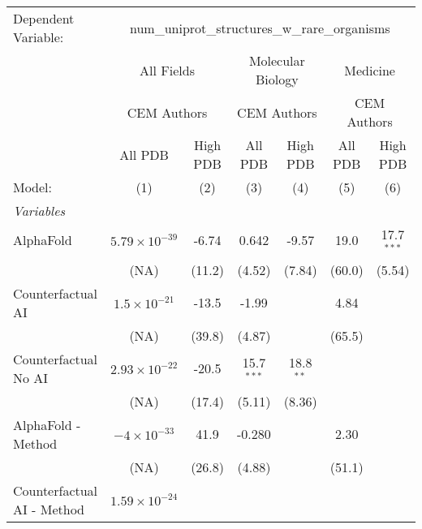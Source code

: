 \begingroup
\centering
\begin{tabular}{lcccccc}
   \tabularnewline \midrule \midrule
   Dependent Variable: & \multicolumn{6}{c}{num\_uniprot\_structures\_w\_rare\_organisms}\\
 & \multicolumn{2}{c}{All Fields} & \multicolumn{2}{c}{Molecular Biology} & \multicolumn{2}{c}{Medicine} \\
\cmidrule(lr){2-3} \cmidrule(lr){4-5} \cmidrule(lr){6-7}
 & \multicolumn{2}{c}{CEM Authors} & \multicolumn{2}{c}{CEM Authors} & \multicolumn{2}{c}{CEM Authors} \\
\cmidrule(lr){2-3} \cmidrule(lr){4-5} \cmidrule(lr){6-7}
 & \multicolumn{1}{c}{All PDB} & \multicolumn{1}{c}{High PDB} & \multicolumn{1}{c}{All PDB} & \multicolumn{1}{c}{High PDB} & \multicolumn{1}{c}{All PDB} & \multicolumn{1}{c}{High PDB} \\
\cmidrule(lr){2-2} \cmidrule(lr){3-3} \cmidrule(lr){4-4} \cmidrule(lr){5-5} \cmidrule(lr){6-6} \cmidrule(lr){7-7}
   Model:                                   & (1)                     & (2)    & (3)          & (4)         & (5)    & (6)\\  
   \midrule
   \emph{Variables}\\
   AlphaFold                                & $5.79\times 10^{-39}$   & -6.74  & 0.642        & -9.57       & 19.0   & 17.7$^{***}$\\   
                                            & (NA)                    & (11.2) & (4.52)       & (7.84)      & (60.0) & (5.54)\\   
   Counterfactual AI                        & $1.5\times 10^{-21}$    & -13.5  & -1.99        &             & 4.84   &   \\   
                                            & (NA)                    & (39.8) & (4.87)       &             & (65.5) &   \\   
   Counterfactual No AI                     & $2.93\times 10^{-22}$   & -20.5  & 15.7$^{***}$ & 18.8$^{**}$ &        &   \\   
                                            & (NA)                    & (17.4) & (5.11)       & (8.36)      &        &   \\   
   AlphaFold - Method                       & $-4\times 10^{-33}$     & 41.9   & -0.280       &             & 2.30   &   \\   
                                            & (NA)                    & (26.8) & (4.88)       &             & (51.1) &   \\   
   Counterfactual AI - Method               & $1.59\times 10^{-24}$   &        &              &             &        &   \\   

\end{tabular}
